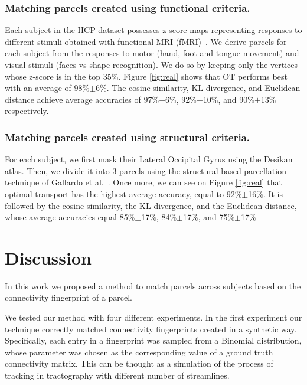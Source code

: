 \subsubsection{Matching parcels created using functional criteria.}
Each subject in the HCP dataset possesses z-score maps representing responses to different stimuli obtained with functional MRI (fMRI)~\cite{Barch2013}. We derive parcels for each subject from the responses to motor (hand, foot and tongue movement) and visual stimuli (faces vs shape recognition). We do so by keeping only the vertices whose z-score is in the top 35\%.
Figure \ref{fig:real} shows that OT performs best with an average of 98\%$\pm$6\%. The cosine similarity, KL divergence, and Euclidean distance achieve average accuracies of 97\%$\pm$6\%, 92\%$\pm$10\%, and 90\%$\pm$13\% respectively.

\subsubsection{Matching parcels created using structural criteria.}
For each subject, we first mask their Lateral Occipital Gyrus using the Desikan atlas. Then, we divide it into 3 parcels using the structural based parcellation technique of Gallardo et al.~\cite{Gallardo2017a}. Once more, we can see on Figure \ref{fig:real} that optimal transport has the highest average accuracy, equal to 92\%$\pm$16\%. It is followed by the cosine similarity, the KL divergence, and the Euclidean distance, whose average accuracies equal 85\%$\pm$17\%, 84\%$\pm$17\%, and 75\%$\pm$17\%

\section{Discussion}
In this work we proposed a method to match parcels across subjects based on the connectivity fingerprint of a parcel. 

We tested our method with four different experiments. In the first experiment our technique correctly matched connectivity fingerprints created in a synthetic way. Specifically, each entry in a fingerprint was sampled from a Binomial distribution, whose parameter was chosen as the corresponding value of a ground truth connectivity matrix. This can be thought as a simulation of the process of tracking in tractography with different number of streamlines. 

